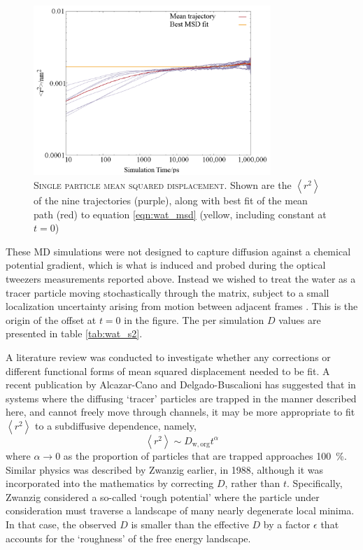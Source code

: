 \begin{figure}
    \centering
    \includegraphics[width=0.8\textwidth]{chapters/water_hopping/figures/Fig_S7.png}
    \caption[Single particle mean squared displacement]{\textsc{Single particle mean squared displacement}. Shown are the $\left\langle r^{2}\right\rangle$ of the nine trajectories (purple), along with best fit of the mean path (red) to equation \ref{eqn:wat_msd} (yellow, including constant at $t=0$)}
    \label{fig:wat_s7}
\end{figure}

These MD simulations were not designed to capture diffusion against a chemical potential gradient, which is what is induced and probed during the optical tweezers measurements reported above. Instead we wished to treat the water as a tracer particle moving stochastically through the matrix, subject to a small localization uncertainty arising from motion between adjacent frames \cite{michaletMeanSquareDisplacement2010}. This is the origin of the offset at $t=0$ in the figure. The per simulation $D$ values are presented in table \ref{tab:wat_s2}. 

A literature review was conducted to investigate whether any corrections or different functional forms of mean squared displacement needed to be fit. A recent publication \cite{alcazar-canoGeneralPhenomenologicalRelation2018} by Alcazar-Cano and Delgado-Buscalioni has suggested that in systems where the diffusing `tracer’ particles are trapped in the manner described here, and cannot freely move through channels, it may be more appropriate to fit $\left\langle r^{2}\right\rangle$ to a subdiffusive dependence, namely, 
\begin{equation}
\left\langle r^{2}\right\rangle \sim D_{\mathrm{w, org}} t^{\alpha}
\end{equation}
where $\alpha \rightarrow 0$ as the proportion of particles that are trapped approaches \SI{100}{\percent}. Similar physics was described by Zwanzig \cite{zwanzigDiffusionRoughPotential1988} earlier, in 1988, although it was incorporated into the mathematics by correcting $D$, rather than $t$. Specifically, Zwanzig considered a so-called `rough potential' where the particle under consideration must traverse a landscape of many nearly degenerate local minima. In that case, the observed $D$ is smaller than the effective $D$ by a factor $\epsilon$ that accounts for the `roughness' of the free energy landscape.

